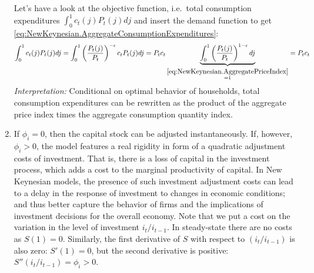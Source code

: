 \begin{enumerate}
Let's have a look at the objective function, i.e.\ total consumption expenditures $\int_0^1 c_t(j) P_t(j) dj$
  and insert the demand function to get \eqref{eq:NewKeynesian.AggregateConsumptionExpenditures}:
\begin{align*}
\int_0^1 c_t(j) P_t(j) dj = \int_0^1 \left(\frac{P_t(j)}{P_t}\right)^{-\epsilon} c_t P_t(j) dj
= P_t c_t \underbrace{\int_0^1 \left(\frac{P_t(j)}{P_t}\right)^{1-\epsilon}  dj}_{\overset{\eqref{eq:NewKeynesian.AggregatePriceIndex}}{=1}} = P_t c_t
\end{align*}
\emph{Interpretation:} Conditional on optimal behavior of households, total consumption expenditures can be rewritten
  as the product of the aggregate price index times the aggregate consumption quantity index.

\item If $\phi_i=0$, then the capital stock can be adjusted instantaneously.
If, however, $\phi_i>0$, the model features a real rigidity in form of a quadratic adjustment costs of investment.
That is, there is a loss of capital in the investment process,
  which adds a cost to the marginal productivity of capital.
In New Keynesian models, the presence of such investment adjustment costs can lead to a delay in the response of investment to changes in economic conditions;
  and thus better capture the behavior of firms and the implications of investment decisions for the overall economy.
Note that we put a cost on the variation in the level of investment $i_t/i_{t-1}$.
In steady-state there are no costs as $S(1)=0$.
Similarly, the first derivative of $S$ with respect to $(i_t/i_{t-1})$ is also zero: $S'(1)=0$,
  but the second derivative is positive: $S''(i_t/i_{t-1}) = \phi_i >0$.


\end{enumerate}

